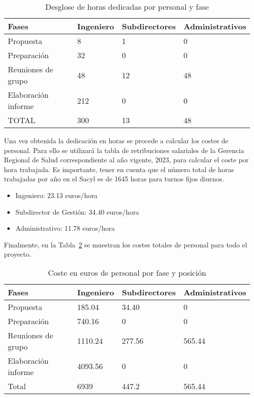 \begin{table}
    \centering
    \begin{tabular}{llll}
        \toprule
        Fases               & Ingeniero & Subdirectores & Administrativos \\
        \midrule
        Propuesta           & 8         & 1             & 0               \\
        Preparación         & 32        & 0             & 0               \\
        Reuniones de grupo  & 48        & 12            & 48              \\
        Elaboración informe & 212       & 0             & 0               \\
        \midrule
        TOTAL               & 300       & 13            & 48              \\
        \bottomrule
    \end{tabular}
    \caption{Desglose de horas dedicadas por personal y fase}
    \label{tab:horas-trabajadas}
\end{table}

Una vez obtenida la dedicación en horas se procede a calcular los costes de personal. Para ello se utilizará la tabla de retribuciones salariales de la Gerencia Regional de Salud correspondiente al año vigente, 2023, para calcular el coste por hora trabajada. Es importante, tener en cuenta que el número total de horas trabajadas por año en el Sacyl es de 1645 horas para turnos fijos diurnos.

\begin{itemize}
    \item Ingeniero: 23.13 euros/hora
    \item Subdirector de Gestión: 34.40 euros/hora
    \item Administrativo: 11.78 euros/hora
\end{itemize}

Finalmente, en la Tabla~\ref{tab:coste-horas} se muestran los costes totales de personal para todo el proyecto.

\begin{table}
    \centering
    \begin{tabular}{llll}
        \toprule
        Fases               & Ingeniero & Subdirectores & Administrativos \\
        \midrule
        Propuesta           & 185.04    & 34.40         & 0               \\
        Preparación         & 740.16    & 0             & 0               \\
        Reuniones de grupo  & 1110.24   & 277.56        & 565.44          \\
        Elaboración informe & 4093.56   & 0             & 0               \\
        \midrule
        Total               & 6939      & 447.2         & 565.44          \\
        \bottomrule
    \end{tabular}
    \caption{Coste en euros de personal por fase y posición}
    \label{tab:coste-horas}
\end{table}

